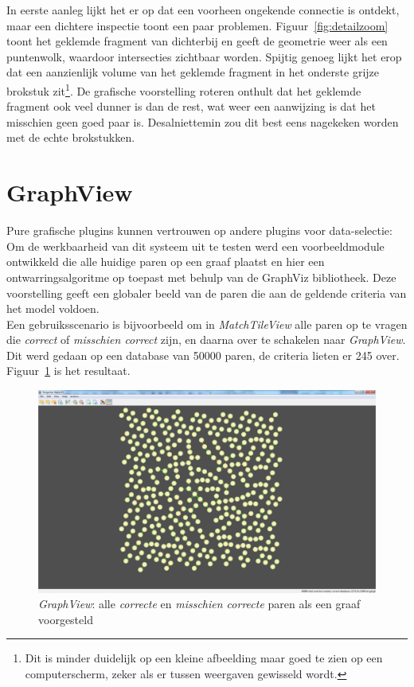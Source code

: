 In eerste aanleg lijkt het er op dat een voorheen ongekende connectie is ontdekt, maar een dichtere inspectie toont een paar problemen. Figuur~\ref{fig:detailzoom} toont het geklemde fragment van dichterbij en geeft de geometrie weer als een puntenwolk, waardoor intersecties zichtbaar worden. Spijtig genoeg lijkt het erop dat een aanzienlijk volume van het geklemde fragment in het onderste grijze brokstuk zit\footnote{Dit is minder duidelijk op een kleine afbeelding maar goed te zien op een computerscherm, zeker als er tussen weergaven gewisseld wordt.}. De grafische voorstelling roteren onthult dat het geklemde fragment ook veel dunner is dan de rest, wat weer een aanwijzing is dat het misschien geen goed paar is. Desalniettemin zou dit best eens nagekeken worden met de echte brokstukken.

\section{GraphView}
Pure grafische plugins kunnen vertrouwen op andere plugins voor data-selectie: Om de werkbaarheid van dit systeem uit te testen werd een voorbeeldmodule ontwikkeld die alle huidige paren op een graaf plaatst en hier een ontwarringsalgoritme op toepast met behulp van de GraphViz bibliotheek. Deze voorstelling geeft een globaler beeld van de paren die aan de geldende criteria van het model voldoen.\\

Een gebruiksscenario is bijvoorbeeld om in \emph{MatchTileView} alle paren op te vragen die \emph{correct} of \emph{misschien correct} zijn, en daarna over te schakelen naar \emph{GraphView}. Dit werd gedaan op een database van 50000 paren, de criteria lieten er 245 over. Figuur~\ref{fig:graphyesmaybe} is het resultaat.\\

\begin{figure}[ht]
	\begin{center}
		\includegraphics[width=1.0\columnwidth]{images/nodeview-yesmaybe.png}
		\caption{\emph{GraphView}: alle \emph{correcte} en \emph{misschien correcte} paren als een graaf voorgesteld}
		\label{fig:graphyesmaybe}
	\end{center}
\end{figure}

